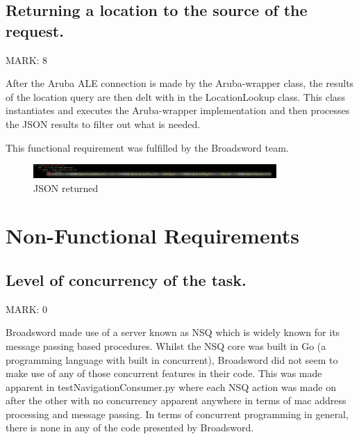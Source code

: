 \documentclass{article}
\begin{document}
\subsection{Returning a location to the source of the request.}
\begin{flushleft}
MARK: 8
\end{flushleft}

\begin{flushleft}
After the Aruba ALE connection is made by the Aruba-wrapper class, the results of the location query are then delt with in the LocationLookup class. This class instantiates and executes the Aruba-wrapper implementation and then processes the JSON results to filter out what is needed. 
\end{flushleft}

\begin{flushleft}
This functional requirement was fulfilled by the Broadsword team.
\end{flushleft}

\begin{figure}[ht]
  \includegraphics[width=350px]{Images/jsonreturn.jpg}
  \caption{JSON returned}
  \label{fig:JSON returned}
\end{figure}

\newpage
\section{Non-Functional Requirements}

\subsection{Level of concurrency of the task.}
\begin{flushleft}
MARK: 0
\end{flushleft}

\begin{flushleft}
Broadsword made use of a server known as NSQ which is widely known for its message passing based procedures. Whilst the NSQ core was built in Go (a programming language with built in concurrent), Broadsword did not seem to make use of any of those concurrent features in their code. This was made apparent in testNavigationConsumer.py where each NSQ action was made on after the other with no concurrency apparent anywhere in terms of mac address processing and message passing. In terms of concurrent programming in general, there is none in any of the code presented by Broadsword. 
\end{flushleft}
\end{document}
